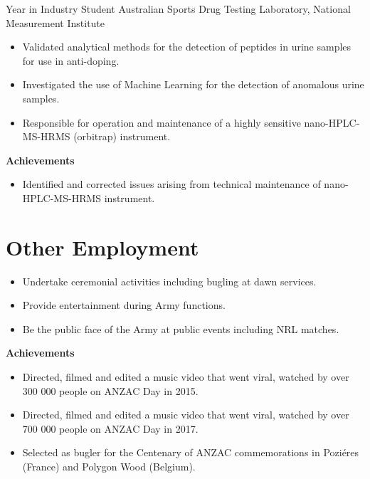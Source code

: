 {Year in Industry Student}
{Australian Sports Drug Testing Laboratory, National Measurement Institute}
{}{}
{%
  \begin{itemize}
    \item Validated analytical methods for the detection of peptides in urine samples for
      use in anti-doping.
    \item Investigated the use of Machine Learning for the detection of anomalous urine samples.
    \item Responsible for operation and maintenance of a highly sensitive nano-HPLC-MS-HRMS
      (orbitrap) instrument.
  \end{itemize}
  \textbf{Achievements}
  \begin{itemize}
    \item Identified and corrected issues arising from technical maintenance of nano-HPLC-MS-HRMS instrument.
  \end{itemize}
}


\pagebreak
\section{Other Employment}

{}{}
{%
  \begin{itemize}
    \item Undertake ceremonial activities including bugling at dawn services.
    \item Provide entertainment during Army functions.
    \item Be the public face of the Army at public events including NRL matches.
  \end{itemize}
  \textbf{Achievements}
  \begin{itemize}
    \item Directed, filmed and edited a music video  that went viral, watched by over 300 000 people on ANZAC Day in 2015.
    \item Directed, filmed and edited a music video  that went viral, watched by over 700 000 people on ANZAC Day in 2017.
    \item Selected as bugler for the Centenary of ANZAC commemorations in Poziéres (France) and Polygon Wood (Belgium).
  \end{itemize}
}

